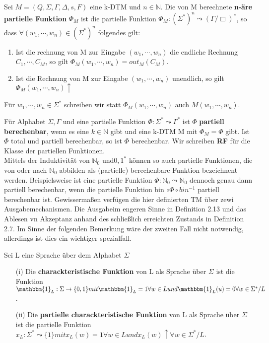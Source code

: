   Sei \(M = (Q, \Sigma, \Gamma, \Delta, s, F)\) eine k-DTM und \(n \in \mathbb{N}\). Die von M berechnete \textbf{n-äre partielle Funktion} \(\Phi_M\) ist die partielle Funktion \(\Phi_M : (\Sigma^*)^n \leadsto (\Gamma / {\Box})^*\), so dass \(\forall (w_1, \cdots, w_n) \in (\Sigma^*)^n\) folgendes gilt:
  \begin{enumerate}
    \item Ist die rechnung von M zur Eingabe \((w_1, \cdots, w_n)\) die endliche Rechnung \(C_1, \cdots, C_M\), so gilt \(\Phi_M(w_1, \cdots, w_n) = out_M(C_M)\).
    \item Ist die Rechnung von M zur Eingabe \((w_1, \cdots, w_n)\) unendlich, so gilt \(\Phi_M(w_1, \cdots, w_n)\uparrow\) 
  \end{enumerate}
  Für \(w_1, \cdots, w_n \in \Sigma^*\) schreiben wir statt \(\Phi_M(w_1, \cdots, w_n)\) auch \(M(w_1, \cdots, w_n)\).

  Für Alphabet \(\Sigma, \Gamma\) und eine partielle Funktion \(\Phi : \Sigma^* \leadsto \Gamma^*\) ist \(\Phi\) \textbf{partiell berechenbar}, wenn es eine \(k \in \mathbb{N}\) gibt und eine k-DTM M mit \(\Phi_M = \Phi\) gibt. Ist \(\Phi\) total und partiell berechenbar, so ist \(\Phi\) berechenbar. Wir schreiben \textbf{RF} für die Klasse der partiellen Funktionen.\\Mittels der Induktivität von \(\mathbb{N}_0\) und\( {0, 1}^*\) können so auch partielle Funktionen, die von oder nach \(\mathbb{N}_0\) abbilden als (partielle) berechenbare Funktion bezeichnent werden. Beispielsweise ist eine partielle Funktion \(\Phi : \mathbb{N}_0 \leadsto \mathbb{N}_0\) dennoch genau dann partiell berechenbar, wenn die partielle Funktion bin \(\circ \Phi \circ bin^{-1}\) partiell berechenbar ist. Gewissermaßen verfügen die hier definierten TM über zewi Ausgabemechanismen. Die Ausgabeim engeren Sinne in Definition 2.13 und das Ablesen vn Akzeptanz anhand des schließlich erreichten Zustands in Definition 2.7. Im Sinne der folgenden Bemerkung wäre der zweiten Fall nicht notwendig, allerdings ist dies ein wichtiger spezialfall.

  Sei L eine Sprache über dem Alphabet \(\Sigma\)
  \begin{itemize}
    \item [(i)] Die \textbf{charackteristische Funktion} von L als Sprache über \(\Sigma\) ist die Funktion \(\mathbbm{1}_L : \Sigma \rightarrow \{0, 1\} mit \mathbbm{1}_L = 1 \forall w \in L und \mathbbm{1}_L (u) = 0 \forall w \in \Sigma^* / L\).
    \item [(ii)] Die \textbf{ partielle charackteristische Funktion} von L als Sprache über \(\Sigma\) ist die partielle Funktion \(x_L : \Sigma^* \leadsto \{1\} mit x_L(w) = 1 \forall w \in L und x_L(w) \uparrow  \forall w \in \Sigma^* / L\). 
  \end{itemize}

